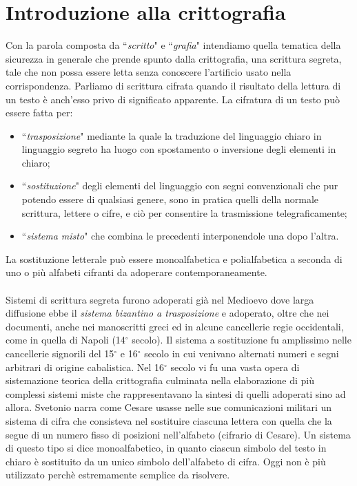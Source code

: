 \documentclass[a4paper,12pt]{tesiinfo}
\begin{document}
\maketitle
\contentspage
\chapter{Introduzione alla crittografia}
Con la parola composta da ``\textit{scritto}" e ``\textit{grafia}" intendiamo quella tematica della sicurezza in generale che prende spunto dalla crittografia, una scrittura segreta, tale che non possa essere letta senza conoscere l'artificio usato nella corrispondenza. Parliamo di scrittura cifrata quando il risultato della lettura di un testo \`e anch'esso privo di significato apparente. La cifratura di un testo pu\`o essere fatta per:
\begin{itemize}
  \item ``\textit{trasposizione}" mediante la quale la traduzione del linguaggio chiaro in linguaggio segreto ha luogo con spostamento o inversione degli elementi in chiaro;
  \item ``\textit{sostituzione}" degli elementi del linguaggio con segni convenzionali che pur potendo essere di qualsiasi genere, sono in pratica quelli della normale scrittura, lettere o cifre, e ci\`o per consentire la trasmissione telegraficamente;
  \item ``\textit{sistema misto}" che combina le precedenti interponendole una dopo l'altra.
\end{itemize} 
La sostituzione letterale pu\`o essere monoalfabetica e polialfabetica a seconda di uno o pi\`u alfabeti cifranti da adoperare contemporaneamente.
\\
\\
Sistemi di scrittura segreta furono adoperati gi\`a nel Medioevo dove larga diffusione ebbe il \textit{sistema bizantino a trasposizione} e adoperato, oltre che nei documenti, anche nei manoscritti greci ed in alcune cancellerie regie occidentali, come in quella di Napoli (14$^\circ$ secolo). Il sistema a sostituzione fu amplissimo nelle cancellerie signorili del 15$^\circ$ e 16$^\circ$ secolo in cui venivano alternati numeri e segni arbitrari di origine cabalistica. Nel 16$^\circ$ secolo vi fu una vasta opera di sistemazione teorica della crittografia culminata nella elaborazione di pi\`u complessi sistemi miste che rappresentavano la sintesi di quelli adoperati sino ad allora. 
Svetonio narra come Cesare usasse nelle sue comunicazioni militari un sistema di cifra che consisteva nel sostituire ciascuna lettera con quella che la segue di un numero fisso di posizioni nell'alfabeto (cifrario di Cesare). Un sistema di questo tipo si dice monoalfabetico, in quanto ciascun simbolo del testo in chiaro \`e sostituito da un unico simbolo dell'alfabeto di cifra. Oggi non \`e pi\`u utilizzato perch\`e estremamente semplice da risolvere.
\end{document}
